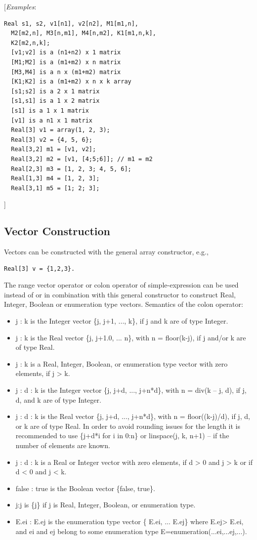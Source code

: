 \documentclass[10pt,a4paper]{report}
\def\doublelabel#1{\label{#1}}
\begin{document}
{[}\emph{Examples}:

\begin{lstlisting}[language=modelica]
  Real s1, s2, v1[n1], v2[n2], M1[m1,n],
  M2[m2,n], M3[n,m1], M4[n,m2], K1[m1,n,k],
  K2[m2,n,k];
  [v1;v2] is a (n1+n2) x 1 matrix
  [M1;M2] is a (m1+m2) x n matrix
  [M3,M4] is a n x (m1+m2) matrix
  [K1;K2] is a (m1+m2) x n x k array
  [s1;s2] is a 2 x 1 matrix
  [s1,s1] is a 1 x 2 matrix
  [s1] is a 1 x 1 matrix
  [v1] is a n1 x 1 matrix
  Real[3] v1 = array(1, 2, 3);
  Real[3] v2 = {4, 5, 6};
  Real[3,2] m1 = [v1, v2];
  Real[3,2] m2 = [v1, [4;5;6]]; // m1 = m2
  Real[2,3] m3 = [1, 2, 3; 4, 5, 6];
  Real[1,3] m4 = [1, 2, 3];
  Real[3,1] m5 = [1; 2; 3];
\end{lstlisting}
{]}

\subsection{Vector Construction}\doublelabel{vector-construction}

Vectors can be constructed with the general array constructor, e.g.,
\begin{lstlisting}[language=modelica]
  Real[3] v = {1,2,3}.
\end{lstlisting}
The range vector operator or colon operator of simple-expression can be
used instead of or in combination with this general constructor to
construct Real, Integer, Boolean or enumeration type vectors. Semantics
of the colon operator:

\begin{itemize}
\item
  j : k is the Integer vector \{j, j+1, ..., k\}, if j and k are of type
  Integer.
\item
  j : k is the Real vector \{j, j+1.0, ... n\}, with n = floor(k-j), if
  j and/or k are of type Real.
\item
  j : k is a Real, Integer, Boolean, or enumeration type vector with
  zero elements, if j \textgreater{} k.
\item
  j : d : k is the Integer vector \{j, j+d, ..., j+n*d\}, with n = div(k
  -- j, d), if j, d, and k are of type Integer.
\item
  j : d : k is the Real vector \{j, j+d, ..., j+n*d\}, with n =
  floor((k-j)/d), if j, d, or k are of type Real. In order to avoid
  rounding issues for the length it is recommended to use \{j+d*i for i
  in 0:n\} or linspace(j, k, n+1) -- if the number of elements are
  known.
\item
  j : d : k is a Real or Integer vector with zero elements, if d
  \textgreater{} 0 and j \textgreater{} k or if d \textless{} 0 and j
  \textless{} k.
\item
  false : true is the Boolean vector \{false, true\}.
\item
  j:j is \{j\} if j is Real, Integer, Boolean, or enumeration type.
\item
  E.ei : E.ej is the enumeration type vector \{ E.ei, ... E.ej\} where
  E.ej\textgreater{} E.ei, and ei and ej belong to some enumeration type
  E=enumeration(...ei,...ej,...).
\end{itemize}
\end{document}
